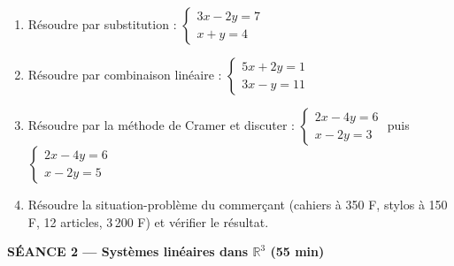 \documentclass[a4paper,11pt]{article}
\begin{document}
\begin{tcolorbox}[colback=appl!5, colframe=appl, boxrule=0.8pt, arc=2pt,
                  left=6pt, right=6pt, top=4pt, bottom=4pt,
                  title={\textbf{APPLICATION --- Séance 1}},
                  colbacktitle=appl, coltitle=white, fonttitle=\bfseries]
\begin{enumerate}[label=\textbf{Exercice \arabic*.}, leftmargin=*, itemsep=4pt]
  \item Résoudre par substitution : $\begin{cases}3x-2y=7\\ x+y=4\end{cases}$
  \item Résoudre par combinaison linéaire : $\begin{cases}5x+2y=1\\ 3x-y=11\end{cases}$
  \item Résoudre par la méthode de Cramer et discuter :
        $\begin{cases}2x-4y=6\\ x-2y=3\end{cases}$
        puis $\begin{cases}2x-4y=6\\ x-2y=5\end{cases}$
  \item Résoudre la situation-problème du commerçant (cahiers à 350 F, stylos
        à 150 F, 12 articles, 3\,200 F) et vérifier le résultat.
\end{enumerate}
\end{tcolorbox}

\newpage
\noindent\colorbox{trac}{%
  \parbox[c][0.72cm][c]{\dimexpr\linewidth-2\fboxsep\relax}{%
    \color{white}\large\textbf{SÉANCE 2 --- Systèmes linéaires dans $\mathbb{R}^3$ (55 min)}}%
}
\end{document}
